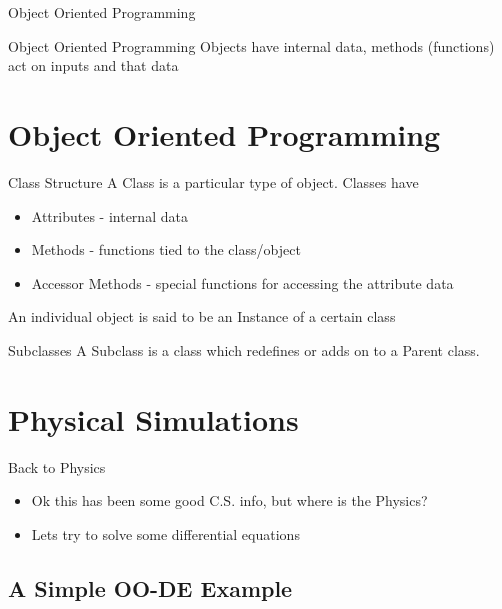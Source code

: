 \documentclass[mathserif]{beamer}
\providecommand{\inputcode}[1]{
  \begin{block}{}
    \scriptsize{}
  \end{block}
}
\begin{document}
\begin{frame}{Object Oriented Programming}
  \begin{block}{Object Oriented Programming}
    Objects have internal data, methods (functions) act on inputs and that data
  \end{block}
  \visible<2->{\inputcode{styles/objective}}
\end{frame}

\section{Object Oriented Programming}

\begin{frame}{Class Structure}
  A \alert{Class} is a particular type of object. Classes have
  \begin{itemize}
    \item \alert{Attributes} - internal data
    \item \alert{Methods} - functions tied to the class/object
    \item \alert{Accessor Methods} - special functions for accessing the attribute data
  \end{itemize}

  An individual object is said to be an \alert{Instance} of a certain class
\end{frame}

\begin{frame}{Subclasses}
  A \alert{Subclass} is a class which redefines or adds on to a \alert{Parent} class. 

  \inputcode{examples/student}
\end{frame}

\section{Physical Simulations}

\begin{frame}{Back to Physics}
  \begin{itemize}
    \item Ok this has been some good C.S. info, but where is the Physics?
    \item<2-> Lets try to solve some differential equations
  \end{itemize}
\end{frame}

\subsection{A Simple OO-DE Example}
\end{document}
